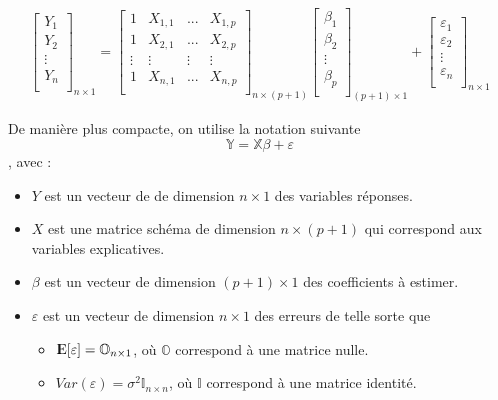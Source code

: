\documentclass[11pt,french]{report}
\newcommand{\E}{{\rm I\kern-.3em E}}
\begin{document}
\begin{align*}
\begin{bmatrix} 
Y_1  \\
Y_2  \\
\vdots \\
Y_n \\
\end{bmatrix}_{n\times 1} =
\begin{bmatrix} 
1 & X_{1,1} & ... & X_{1,p} \\
1 & X_{2,1} & ... & X_{2,p}  \\
\vdots & \vdots & \vdots & \vdots \\
1 &  X_{n,1} & ... & X_{n,p} \\
\end{bmatrix}_{n\times (p + 1)} 
\begin{bmatrix} 
\beta_1 \\
\beta_2  \\
\vdots \\
\beta_p \\
\end{bmatrix}_{(p + 1) \times 1}+ 
\begin{bmatrix} 
\varepsilon_1 \\
\varepsilon_2 \\
\vdots \\
\varepsilon_n \\
\end{bmatrix}_{n\times 1} 
\end{align*}

De manière plus compacte, on utilise la notation suivante
$$
\mathbb{Y} = \mathbb{X}  \mathbb{\beta}  + \mathbb{\varepsilon}  
$$
, avec :
\begin{itemize}
\item $Y$ est un vecteur de de dimension $n \times 1$ des variables réponses.
\item $X$ est une matrice schéma de dimension $n \times (p+1)$ qui correspond aux variables explicatives.
\item $\beta$ est un vecteur de dimension $(p+1) \times 1$ des coefficients à estimer.
\item $\varepsilon$ est un vecteur de dimension $n \times 1$ des erreurs de telle sorte que
     \begin{itemize}
     \item $\E[\varepsilon] = \mathbb{O}_{n\times 1}$, où $\mathbb{O}$ correspond à une matrice nulle.
     \item $Var(\varepsilon) = \sigma^2 \mathbb{I}_{n \times n}$, où $\mathbb{I}$ correspond à une matrice identité.
     \end{itemize}
\end{itemize}
\end{document}
